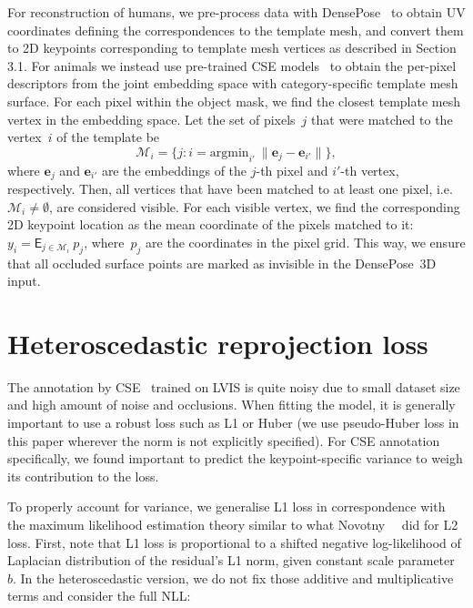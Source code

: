 For reconstruction of humans, we pre-process data with DensePose~\cite{guler18densepose:} to obtain UV coordinates defining the correspondences to the template mesh, 
and convert them to 2D keypoints corresponding to template mesh vertices as described in Section 3.1.
For animals we instead use pre-trained CSE models~\cite{neverova20continuous} to obtain the per-pixel descriptors from the joint embedding space with category-specific template mesh surface.
For each pixel within the object mask, we find the closest template mesh vertex in the embedding space.
Let the set of pixels~$j$ that were matched to the vertex~$i$ of the template be
\begin{equation}
\mathcal{M}_i = \{j : i = \textrm{argmin}_{i'}~  \|\mathbf{e}_j - \mathbf{e}_{i'}\| \},
\end{equation}
where $\mathbf{e}_j$ and $\mathbf{e}_{i'}$ are the embeddings of the $j$-th pixel and $i'$-th vertex, respectively.
Then, all vertices that have been matched to at least one pixel, i.e.~$\mathcal{M}_i \ne \emptyset$, are considered visible.
For each visible vertex, we find the corresponding 2D keypoint location as the mean coordinate of the pixels matched to it: $y_i = \mathsf{E}_{j \in \mathcal{M}_i}~ p_j$, where~$p_j$ are the coordinates in the pixel grid.
This way, we ensure that all occluded surface points are marked as invisible in the DensePose~3D input.

\section{Heteroscedastic reprojection loss}

The annotation by CSE~\cite{neverova20continuous} trained on LVIS is quite noisy due to small dataset size and high amount of noise and occlusions.
When fitting the model, it is generally important to use a robust loss such as L1 or Huber (we use pseudo-Huber loss in this paper wherever the norm is not explicitly specified).
For CSE annotation specifically, we found important to predict the keypoint-specific variance to weigh its contribution to the loss.

To properly account for variance, we generalise L1 loss in correspondence with the maximum likelihood estimation theory similar to what Novotny~\etal~\cite{novotny18capturing} did for L2 loss.
First, note that L1 loss is proportional to a shifted negative log-likelihood of Laplacian distribution of the residual's L1 norm, given constant scale parameter~$b$.
In the heteroscedastic version, we do not fix those additive and multiplicative terms and consider the full NLL:

